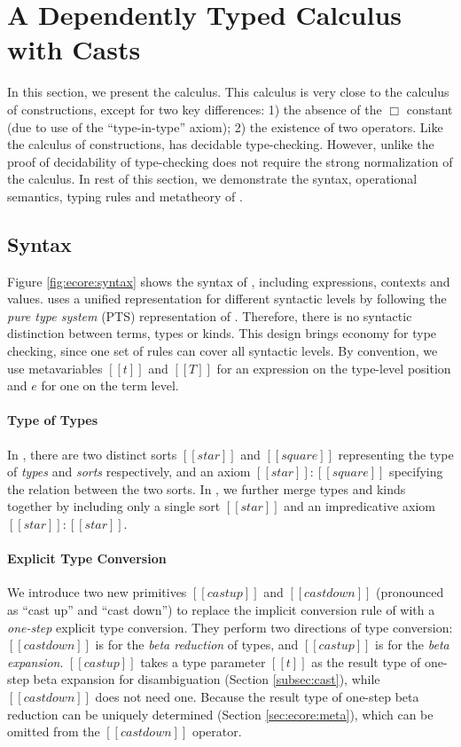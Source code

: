 
\section{A Dependently Typed Calculus with Casts}\label{sec:ecore}

In this section, we present the \ecore calculus. This calculus is very
close to the calculus of constructions, except for two key differences:
1) the absence of the $\Box$ constant (due to use of the
``type-in-type'' axiom); 2) the existence of two \cast operators. Like
the calculus of constructions, \ecore has decidable
type-checking. However, unlike \cc the proof of decidability of
type-checking does not require the strong normalization of the
calculus.  In rest of this section, we demonstrate the syntax,
operational semantics, typing rules and metatheory of \ecore.

\subsection{Syntax}\label{sec:ecore:syn}

Figure \ref{fig:ecore:syntax} shows the syntax of \ecore, including
expressions, contexts and values. \ecore uses a unified 
representation for different syntactic levels by following the
\emph{pure type system} (PTS) representation of \cc. Therefore, there
is no syntactic distinction between terms, types or kinds. This design
brings economy for type checking, since one set of rules can cover
all syntactic levels. By convention, we use metavariables $[[t]]$ and
$[[T]]$ for an expression on the type-level position and $e$ for one
on the term level.

\paragraph{Type of Types}
In \cc, there are two distinct sorts $[[star]]$ and
$[[square]]$ representing the type of \emph{types} and \emph{sorts}
respectively, and an axiom $[[star]]:[[square]]$ specifying the
relation between the two sorts. In \ecore, we further merge types and
kinds together by including only a single sort $[[star]]$ and an
impredicative axiom $[[star]]:[[star]]$.

\paragraph{Explicit Type Conversion}

We introduce two new primitives $[[castup]]$ and $[[castdown]]$
(pronounced as ``cast up'' and ``cast down'') to replace the implicit
conversion rule of \cc with a \emph{one-step} explicit type
conversion. They perform two directions of type conversion:
$[[castdown]]$ is for the \emph{beta reduction} of types, and
$[[castup]]$ is for the \emph{beta expansion}. $[[castup]]$ takes a
type parameter $[[t]]$ as the result type of one-step beta expansion
for disambiguation (Section \ref{subsec:cast}), while $[[castdown]]$
does not need one.  Because the result type of one-step beta reduction
can be uniquely determined (Section \ref{sec:ecore:meta}), which can
be omitted from the $[[castdown]]$ operator.

